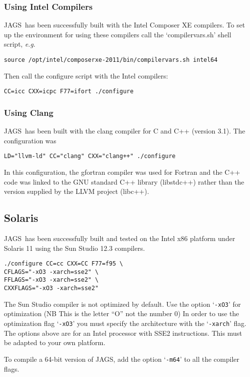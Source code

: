 \documentclass[11pt, a4paper, titlepage]{article}
\newcommand{\JAGS}{\textsf{JAGS}}
\newcommand{\samp}[1]{{`\bgroup\normalfont\texttt{#1}'\egroup}}
\newcommand{\file}[1]{{`\normalfont\textsf{#1}'}}
\let\option=\samp
\begin{document}
\subsubsection{Using Intel Compilers}

\JAGS\ has been successfully built with the Intel Composer XE
compilers. To set up the environment for using these compilers call
the \file{compilervars.sh} shell script, {\em e.g.}
\begin{verbatim}
source /opt/intel/composerxe-2011/bin/compilervars.sh intel64
\end{verbatim}
Then call the configure script with the Intel compilers:
\begin{verbatim}
CC=icc CXX=icpc F77=ifort ./configure 
\end{verbatim}

\subsubsection{Using Clang}

\JAGS\ has been built with the clang compiler for C and C++ (version 3.1).
The configuration was
\begin{verbatim}
LD="llvm-ld" CC="clang" CXX="clang++" ./configure
\end{verbatim}
In this configuration, the gfortran compiler was used for Fortran and
the C++ code was linked to the GNU standard C++ library (libstdc++)
rather than the version supplied by the LLVM project (libc++).

\subsection{Solaris}

\JAGS\ has been successfully built and tested on the Intel x86
platform under Solaris 11 using the Sun Studio 12.3 compilers.
\begin{verbatim}
./configure CC=cc CXX=CC F77=f95 \
CFLAGS="-xO3 -xarch=sse2" \
FFLAGS="-xO3 -xarch=sse2" \
CXXFLAGS="-xO3 -xarch=sse2"
\end{verbatim}
The Sun Studio compiler is not optimized by default. Use the option
\option{-xO3} for optimization (NB This is the letter ``O'' not the
number 0) In order to use the optimization flag \option{-xO3} you
must specify the architecture with the \option{-xarch} flag. The options
above are for an Intel processor with SSE2 instructions. This must be
adapted to your own platform.

To compile a 64-bit version of JAGS, add the option \option{-m64} to
all the compiler flags.
\end{document}
